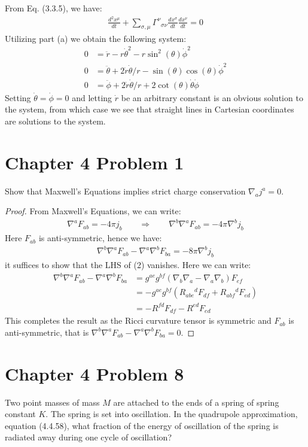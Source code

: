\documentclass[11pt, onesided]{book}
\theoremstyle{break}
\theoremstyle{break}
\begin{document}
From Eq. (3.3.5), we have:
\begin{align*}
\frac{d^2 x^\mu}{dt}+ \sum_{\sigma,\mu} \Gamma^\nu{}_{\sigma\nu}\frac{d x^\sigma}{d t} \frac{d x^\nu}{d t}=0
\end{align*}
Utilizing part (a) we obtain the following system:
\begin{align*}
0&=\ddot{r} - r\dot{\theta}^2 - r\sin^2(\theta) \dot{\phi}^2 \\
0&=\ddot{\theta}+ {2\dot{r}\dot{\theta}}/{r} - \sin(\theta) \cos(\theta) \dot{\phi}^2 \\
0&= \ddot{\phi}+2\dot{r}\dot{\theta}/r + 2\cot(\theta) \dot{\theta}\dot{\phi}
\end{align*}
Setting $\dot{\theta} = \dot{\phi} = 0$ and letting $\dot{r}$ be an arbitrary constant is an obvious solution to the system, from which case we see that straight lines in Cartesian coordinates are solutions to the system. 

\newpage
\section{Chapter 4 Problem 1}
Show that Maxwell's Equations implies strict charge conservation $\nabla_aj^a = 0$.
\begin{proof}
From Maxwell's Equations, we can write:
\begin{align*}
\nabla^a F_{ab} = -4\pi j_b \qquad\Rightarrow \qquad \nabla^b\nabla^a F_{ab} = -4\pi\nabla^b j_b
\end{align*}
Here $F_{ab}$ is anti-symmetric, hence we have:
\begin{align}
\nabla^b\nabla^a F_{ab} -\nabla^a\nabla^b F_{ba} = -8\pi \nabla^b j_b
\end{align}
it suffices to show that the LHS of (2) vanishes. Here we can write:
\begin{align*}
\nabla^b\nabla^a F_{ab} -\nabla^a\nabla^b F_{ba} &= g^{ae}g^{bf}(\nabla_b\nabla_a - \nabla_a\nabla_b)F_{ef}\\
&= -g^{ae}g^{bf}(R_{abe}{}^dF_{df} + R_{abf}{}^dF_{ed})\\
&= -R^{fd}F_{df}-R^{ed} F_{ed}
\end{align*}
This completes the result as the Ricci curvature tensor is symmetric and $F_{ab}$ is anti-symmetric, that is $\nabla^b\nabla^a F_{ab} -\nabla^a\nabla^b F_{ba} = 0$.
\end{proof}

\newpage
\section{Chapter 4 Problem 8}
Two point masses of mass $M$ are attached to the ends of a spring of spring constant $K$. The spring is set into oscillation. In the quadrupole approximation, equation (4.4.58), what fraction of the energy of oscillation of the spring is radiated away during one cycle of oscillation?\\
\end{document}
